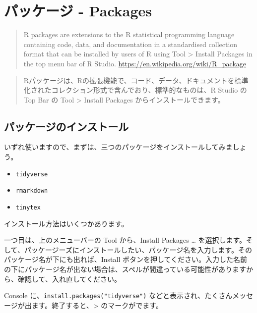 \documentclass[
  xelatex, ja=standard]{bxjsbook}
\providecommand{\tightlist}{%
  \setlength{\itemsep}{0pt}\setlength{\parskip}{0pt}}
\theoremstyle{definition}
\theoremstyle{definition}
\theoremstyle{definition}
\theoremstyle{definition}
\theoremstyle{remark}
\begin{document}
\hypertarget{ux30d1ux30c3ux30b1ux30fcux30b8---packages}{%
\section{パッケージ - Packages}\label{ux30d1ux30c3ux30b1ux30fcux30b8---packages}}

\begin{quote}
R packages are extensions to the R statistical programming language containing code, data, and documentation in a standardised collection format that can be installed by users of R using Tool \textgreater{} Install Packages in the top menu bar of R Studio. \url{https://en.wikipedia.org/wiki/R_package}
\end{quote}

\begin{quote}
Rパッケージは、Rの拡張機能で、コード、データ、ドキュメントを標準化されたコレクション形式で含んでおり、標準的なものは、R Studio の Top Bar の Tool \textgreater{} Install Packages からインストールできます。
\end{quote}

\hypertarget{ux30d1ux30c3ux30b1ux30fcux30b8ux306eux30a4ux30f3ux30b9ux30c8ux30fcux30eb}{%
\subsection{パッケージのインストール}\label{ux30d1ux30c3ux30b1ux30fcux30b8ux306eux30a4ux30f3ux30b9ux30c8ux30fcux30eb}}

いずれ使いますので、まずは、三つのパッケージをインストールしてみましょう。

\begin{itemize}
\tightlist
\item
  \texttt{tidyverse}
\item
  \texttt{rmarkdown}
\item
  \texttt{tinytex}
\end{itemize}

インストール方法はいくつかあります。

一つ目は、上のメニューバーの Tool から、Install Packages \ldots{} を選択します。そして、パッケージーズにインストールしたい、パッケージ名を入力します。そのパッケージ名が下にも出れば、Install ボタンを押してください。入力した名前の下にパッケージ名が出ない場合は、スペルが間違っている可能性がありますから、確認して、入れ直してください。

Console に、\texttt{install.packages("tidyverse")} などと表示され、たくさんメッセージが出ます。終了すると、\textgreater{} のマークがでます。
\end{document}
